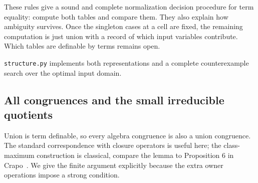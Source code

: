 These rules give a sound and complete normalization decision procedure for term
equality: compute both tables and compare them. They also explain how
ambiguity survives. Once the singleton cases at a cell are fixed, the
remaining computation is just union with a record of which input
variables contribute. Which tables are definable by terms remains open.

\texttt{structure.py} implements both representations and a complete
counterexample search over the optimal input domain.

\subsection{All congruences and the small irreducible quotients}

Union is term definable, so every algebra congruence is also a union
congruence. The standard correspondence with closure operators is useful
here; the class-maximum construction is classical, compare the lemma to
Proposition 6 in Crapo~\cite{Crapo1967}. We give the finite argument
explicitly because the extra owner operations impose a strong condition.

